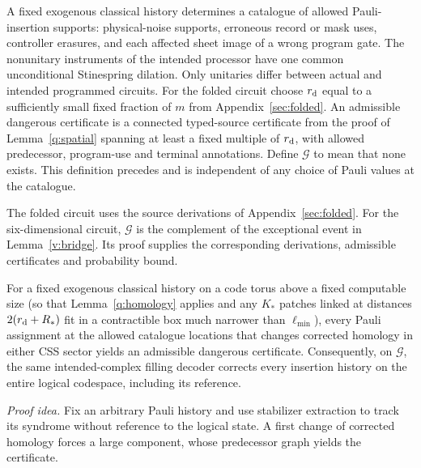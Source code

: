 A fixed exogenous classical history determines a catalogue of allowed
Pauli-insertion supports: physical-noise supports, erroneous record
or mask uses, controller erasures, and each affected sheet image of
a wrong program gate. The nonunitary instruments of the intended
processor have one common unconditional Stinespring dilation. Only
unitaries differ between actual and intended programmed circuits.
For the folded circuit choose \(r_{\rm d}\) equal to a sufficiently small fixed fraction of \(m\) from Appendix~\ref{sec:folded}. An admissible dangerous certificate is a
connected typed-source certificate from the proof of Lemma~\ref{q:spatial}
spanning at least a fixed multiple of \(r_{\rm d}\), with allowed
predecessor, program-use and terminal annotations. Define
\(\mathcal G\) to mean that none exists. This definition precedes
and is independent of any choice of Pauli values at the catalogue.

The folded circuit uses the source derivations of Appendix~\ref{sec:folded}.
For the six-dimensional circuit, \(\mathcal G\) is the complement of the
exceptional event in Lemma~\ref{v:bridge}. Its proof supplies the corresponding
derivations, admissible certificates and probability bound.

\begin{lemma}\label{q:universal}
For a fixed exogenous classical history on a code torus above
a fixed computable size (so that Lemma~\ref{q:homology} applies and any
\(K_*\) patches linked at distances \(2(r_{\rm d}+R_*)\) fit in a
contractible box much narrower than \(\ell_{\min}\)), every Pauli assignment at
the allowed catalogue locations that changes corrected homology in
either CSS sector yields an admissible dangerous certificate.
Consequently, on \(\mathcal G\), the same intended-complex filling
decoder corrects every insertion history on the entire logical
codespace, including its reference.
\end{lemma}
\par\noindent\emph{Proof idea.} Fix an arbitrary Pauli history and use stabilizer extraction to track its syndrome without reference to the logical state. A first change of corrected homology forces a large component, whose predecessor graph yields the certificate.

